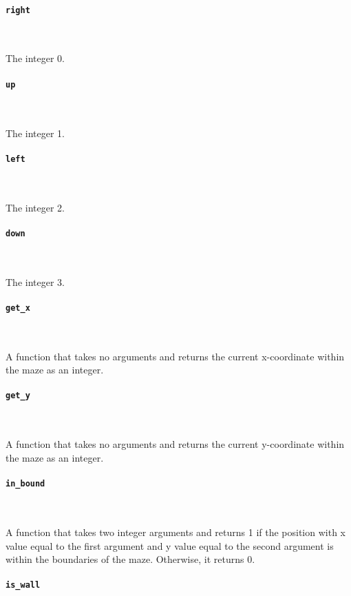 \paragraph{\texttt{right}} \

The integer 0.

\paragraph{\texttt{up}} \

The integer 1.

\paragraph{\texttt{left}} \

The integer 2.

\paragraph{\texttt{down}} \

The integer 3.

\paragraph{\texttt{get\_x}} \

A function that takes no arguments and returns the current x-coordinate within the maze as an integer.

\paragraph{\texttt{get\_y}} \

A function that takes no arguments and returns the current y-coordinate within the maze as an integer.

\paragraph{\texttt{in\_bound}} \

A function that takes two integer arguments and returns 1 if the position with x value equal to the first argument and y value equal to the second argument is within the boundaries of the maze. Otherwise, it returns 0.

\paragraph{\texttt{is\_wall}} \

